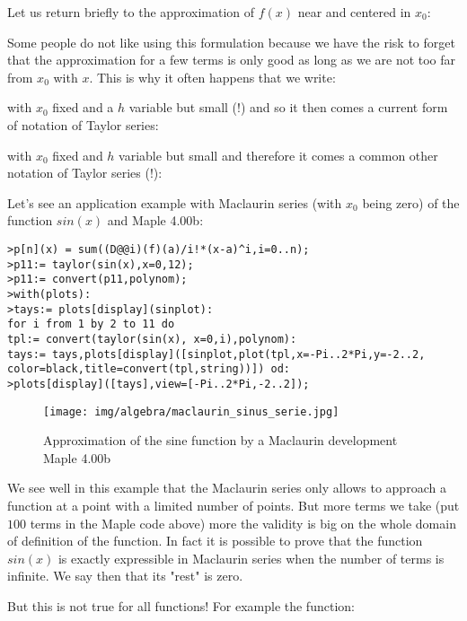 	Let us return briefly to the approximation of $f (x)$ near and centered in $x_0$:
	
	Some people do not like using this formulation because we have the risk to forget that the approximation for a few terms is only good as long as we are not too far from $x_0$ with $x$. This is why it often happens that we write:
	
	with $x_0$ fixed and a $h$ variable but small (!) and so it then comes a current form of notation of Taylor series:
	
	with $x_0$ fixed and $h$ variable but small and therefore it comes a common other notation of Taylor series (!):
	
	Let's see an application example with Maclaurin series (with $x_0$ being zero) of the function $sin (x)$ and Maple 4.00b:
	
	\texttt{>p[n](x) = sum((D@@i)(f)(a)/i!*(x-a)\string^i,i=0..n);\\
	>p11:= taylor(sin(x),x=0,12);\\
	>p11:= convert(p11,polynom);\\
	>with(plots):\\
	>tays:= plots[display](sinplot):\\
	for i from 1 by 2 to 11 do\\
	tpl:= convert(taylor(sin(x), x=0,i),polynom):\\
	tays:= tays,plots[display]([sinplot,plot(tpl,x=-Pi..2*Pi,y=-2..2,\\
	color=black,title=convert(tpl,string))]) od: \\
	>plots[display]([tays],view=[-Pi..2*Pi,-2..2]);}

	\begin{figure}[H]
		\centering
		\texttt{[image: img/algebra/maclaurin\_sinus\_serie.jpg]}
		\caption{Approximation of the sine function by a Maclaurin development Maple 4.00b}
	\end{figure}
	We see well in this example that the Maclaurin series only allows to approach a function at a point with a limited number of points. But more terms we take (put $100$ terms in the Maple code above) more the validity is big on the whole domain of definition of the function. In fact it is possible to prove that the function $sin (x)$ is exactly expressible in Maclaurin series when the number of terms is infinite. We say then that its "rest" is zero.
	
	But this is not true for all functions! For example the function:
	
